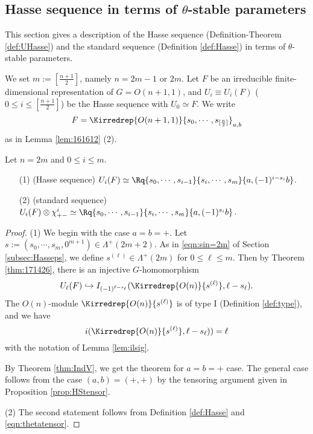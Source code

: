 \subsection{Hasse sequence in terms of $\theta$-stable parameters}
\label{subsec:HasseAq}

This section gives a description of the Hasse sequence 
 (Definition-Theorem \ref{def:UHasse})
 and the standard sequence (Definition \ref{def:Hasse})
 in terms of $\theta$-stable parameters.  



We set $m:=[\frac{n+1}{2}]$, 
 namely $n=2m-1$ or $2m$.  
Let $F$ be an irreducible finite-dimensional representation of $G=O(n+1,1)$,
 and $U_i \equiv U_i(F)$
 ($0 \le i \le [\frac{n+1}{2}]$) be the Hasse sequence with $U_0 \simeq F$.  
We write
\[
   F=\Kirredrep{O(n+1,1)}{s_0, \cdots, s_{[\frac n 2]}}_{a, b}
\]
as in Lemma \ref{lem:161612} (2).  
\begin{theorem}
\label{thm:171471}
Let $n=2m$
 and $0 \le i \le m$.  
\begin{enumerate}
\item[{\rm{(1)}}]
{\rm{(Hasse sequence)}}\enspace
$U_i(F) \simeq \Rq{s_0, \cdots, s_{i-1}}{s_i, \cdots, s_m}
{a, (-1)^{i-s_i} b}$.  
\item[{\rm{(2)}}]
{\rm{(standard sequence)}}\enspace
$U_i(F) \otimes \chi_{+-}^i \simeq 
\Rq{s_0, \cdots, s_{i-1}}{s_i, \cdots, s_m}{a, (-1)^{s_i}b}$. 
\end{enumerate}
\end{theorem}
\begin{proof}
(1)\enspace
We begin with the case $a=b=+$.  
Let $s:=(s_0,\cdots,s_m,0^{m+1}) \in \Lambda^+(2m+2)$.  
As in \eqref{eqn:sin=2m} of Section \ref{subsec:Hasseps}, 
 we define $s^{(\ell)} \in \Lambda^+(2m)$
 for $0 \le \ell \le m$.  
Then by Theorem \ref{thm:171426}, 
 there is an injective $G$-homomorphism
\[
  U_\ell(F) 
  \hookrightarrow 
  I_{(-1)^{\ell-s_{\ell}}}(\Kirredrep {O(n)}{s^{(\ell)}}, \ell-s_\ell).  
\]
The $O(n)$-module $\Kirredrep{O(n)}{s^{(\ell)}}$ is of type I
 (Definition \ref{def:type}), 
 and we have 
\[
  i(\Kirredrep{O(n)}{s^{(\ell)}}, \ell-s_\ell))=\ell
\]
 with the notation of Lemma \ref{lem:ilsig}.  

By Theorem \ref{thm:IndV}, 
 we get the theorem for $a=b=+$ case.  
The general case follows from the case
 $(a,b)=(+,+)$
 by the tensoring argument given in Proposition \ref{prop:HStensor}.  
\par\noindent
(2)\enspace
The second statement follows from Definition \ref{def:Hasse}
 and \eqref{eqn:thetatensor}.  
\end{proof}



